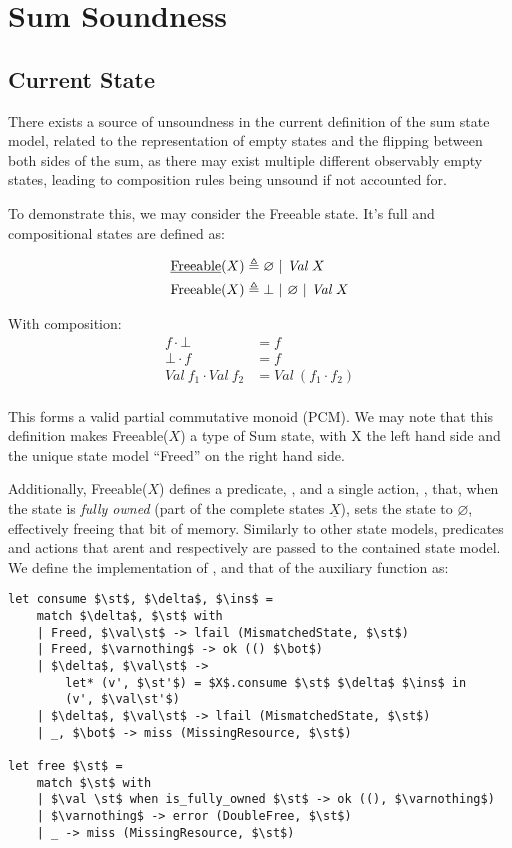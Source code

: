 \chapter{Sum Soundness}

\section{Current State}

There exists a source of unsoundness in the current definition of the sum state model, related to the representation of empty states and the flipping between both sides of the sum, as there may exist multiple different observably empty states, leading to composition rules being unsound if not accounted for.

To demonstrate this, we may consider the Freeable state. It's full and compositional states are defined as:

\newcommand{\val}[0]{\textit{Val}~}

\begin{align*}
	\text{\underline{Freeable}}(X) &\defeq \varnothing ~|~\val X\\
	\text{Freeable}(X) &\defeq \bot ~|~ \varnothing ~|~ \val X
\end{align*}

With composition:
\begin{align*}
	f \cdot \bot &= f\\
	\bot \cdot f &= f\\
	\val f_1 \cdot \val f_2 &= \val (f_1\cdot f_2)\\
\end{align*}

This forms a valid partial commutative monoid (PCM). We may note that this definition makes Freeable($X$) a type of Sum state, with X the left hand side and the unique state model ``Freed'' on the right hand side.

Additionally, Freeable($X$) defines a predicate, , and a single action, , that, when the state is \textit{fully owned} (part of the complete states $\underline{X}$), sets the state to $\varnothing$, effectively freeing that bit of memory. Similarly to other state models, predicates and actions that arent  and  respectively are passed to the contained state model. We define the implementation of ,  and that of the auxiliary  function as:

\begin{lstlisting}
let consume $\st$, $\delta$, $\ins$ =
	match $\delta$, $\st$ with
	| Freed, $\val\st$ -> lfail (MismatchedState, $\st$)
	| Freed, $\varnothing$ -> ok (() $\bot$)
	| $\delta$, $\val\st$ ->
		let* (v', $\st'$) = $X$.consume $\st$ $\delta$ $\ins$ in
		(v', $\val\st'$)
	| $\delta$, $\val\st$ -> lfail (MismatchedState, $\st$)
	| _, $\bot$ -> miss (MissingResource, $\st$)

let free $\st$ =
	match $\st$ with
	| $\val \st$ when is_fully_owned $\st$ -> ok ((), $\varnothing$)
	| $\varnothing$ -> error (DoubleFree, $\st$)
	| _ -> miss (MissingResource, $\st$)
\end{lstlisting}

